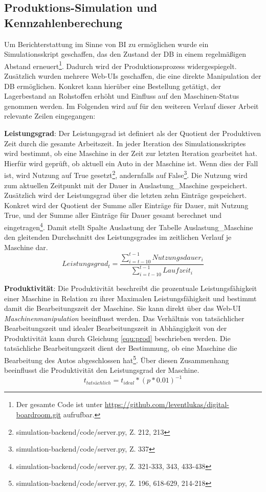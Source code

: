 \subsection{Produktions-Simulation und Kennzahlenberechung} \label{abs:Kenn}
 Um Berichterstattung im Sinne von \ac{BI} zu ermöglichen wurde ein Simulationsskript geschaffen, das den Zustand der \ac{DB} in einem regelmäßigen Abstand erneuert\footnote{Der gesamte Code ist unter \url{https://github.com/leventlukas/digital-boardroom.git} aufrufbar.}. Dadurch wird der Produktionsprozess widergespiegelt. Zusätzlich wurden mehrere Web-UIs geschaffen, die eine direkte Manipulation der \ac{DB} ermöglichen. Konkret kann hierüber eine Bestellung getätigt, der Lagerbestand an Rohstoffen erhöht und Einfluss auf den Maschinen-Status genommen werden. Im Folgenden wird auf für den weiteren Verlauf dieser Arbeit relevante Zeilen eingegangen:

\textbf{Leistungsgrad}: Der Leistungsgrad ist definiert als der Quotient der Produktiven Zeit durch die gesamte Arbeitszeit. In jeder Iteration des Simulationsskriptes wird bestimmt, ob eine Maschine in der Zeit zur letzten Iteration gearbeitet hat. Hierfür wird geprüft, ob aktuell ein Auto in der Maschine ist. Wenn dies der Fall ist, wird Nutzung auf True gesetzt\footnote{simulation-backend/code/server.py,  Z. 212, 213}, andernfalls
 auf False\footnote{simulation-backend/code/server.py, Z. 337}. Die Nutzung wird zum aktuellen Zeitpunkt mit der Dauer in Auslastung\_Maschine gespeichert. Zusätzlich wird der Leistungsgrad über die letzten zehn Einträge gespeichert. Konkret wird der Quotient der Summe aller Einträge für Dauer, mit Nutzung True, und der Summe aller Einträge für Dauer gesamt berechnet und eingetragen\footnote{simulation-backend/code/server.py, Z. 321-333, 343, 433-438}. Damit stellt Spalte Auslastung der Tabelle Auslastung\_Maschine den gleitenden Durchschnitt des Leistungsgrades im zeitlichen Verlauf je Maschine dar.
 \begin{equation}\label{equ:nutz}
    Leistungsgrad_t = \frac{\sum_{i=t-10}^{t-1} Nutzungsdauer_i}{\sum_{i=t-10}^{t-1} Laufzeit_i}
\end{equation}

\textbf{Produktivität}: Die Produktivität beschreibt die prozentuale Leistungsfähigkeit einer Maschine in Relation zu ihrer Maximalen Leistungsfähigkeit und bestimmt damit die Bearbeitungszeit der Maschine. Sie kann direkt über das Web-UI \textit{Maschinenmanipulation} beeinflusst werden. Das Verhältnis von tatsächlicher Bearbeitungszeit und idealer Bearbeitungszeit in Abhängigkeit von der Produktivität kann durch Gleichung \ref{equ:prod} beschrieben werden. Die tatsächliche Bearbeitungszeit dient der Bestimmung, ob eine Maschine die Bearbeitung des Autos abgeschlossen hat\footnote{simulation-backend/code/server.py, Z. 196, 618-629, 214-218}. Über diesen Zusammenhang beeinflusst die Produktivität den Leistungsgrad der Maschine.
\begin{equation}\label{equ:prod}
    t_{tatsächlich} = t_{ideal}*(p*0.01)^{-1}
\end{equation}

